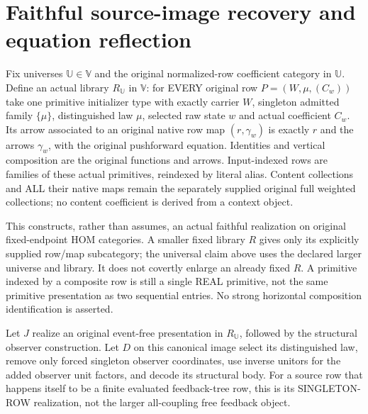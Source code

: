 \documentclass{article}
\begin{document}
\section{Faithful source-image recovery and equation reflection}
Fix universes $\mathbb U\in\mathbb V$ and the original normalized-row coefficient category in $\mathbb U$. Define an actual library $R_{\mathbb U}$ in $\mathbb V$: for EVERY original row $P=(W,\mu,(C_w))$ take one primitive initializer type with exactly carrier $W$, singleton admitted family $\{\mu\}$, distinguished law $\mu$, selected raw state $w$ and actual coefficient $C_w$. Its arrow associated to an original native row map $(r,\gamma_w)$ is exactly $r$ and the arrows $\gamma_w$, with the original pushforward equation. Identities and vertical composition are the original functions and arrows. Input-indexed rows are families of these actual primitives, reindexed by literal alias. Content collections and ALL their native maps remain the separately supplied original full weighted collections; no content coefficient is derived from a context object.

This constructs, rather than assumes, an actual faithful realization on original fixed-endpoint HOM categories. A smaller fixed library $R$ gives only its explicitly supplied row/map subcategory; the universal claim above uses the declared larger universe and library. It does not covertly enlarge an already fixed $R$. A primitive indexed by a composite row is still a single REAL primitive, not the same primitive presentation as two sequential entries. No strong horizontal composition identification is asserted.

Let $J$ realize an original event-free presentation in $R_{\mathbb U}$, followed by the structural observer construction. Let $D$ on this canonical image select its distinguished law, remove only forced singleton observer coordinates, use inverse unitors for the added observer unit factors, and decode its structural body. For a source row that happens itself to be a finite evaluated feedback-tree row, this is its SINGLETON-ROW realization, not the larger all-coupling free feedback object.
\end{document}
